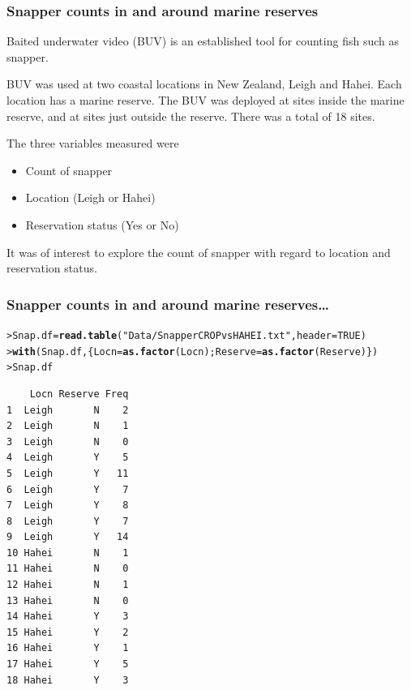 \documentclass{beamer}\usepackage[]{graphicx}\usepackage[]{xcolor}
\makeatletter
\newcommand{\hlnum}[1]{\textcolor[rgb]{0.686,0.059,0.569}{#1}}%
\newcommand{\hlstr}[1]{\textcolor[rgb]{0.192,0.494,0.8}{#1}}%
\newcommand{\hlstd}[1]{\textcolor[rgb]{0.345,0.345,0.345}{#1}}%
\newcommand{\hlkwb}[1]{\textcolor[rgb]{0.69,0.353,0.396}{#1}}%
\newcommand{\hlkwc}[1]{\textcolor[rgb]{0.333,0.667,0.333}{#1}}%
\newcommand{\hlkwd}[1]{\textcolor[rgb]{0.737,0.353,0.396}{\textbf{#1}}}%
\newenvironment{kframe}{%
 \def\at@end@of@kframe{}%
 \ifinner\ifhmode%
  \def\at@end@of@kframe{\end{minipage}}%
  \begin{minipage}{\columnwidth}%
 \fi\fi%
 \def\FrameCommand##1{\hskip\@totalleftmargin \hskip-\fboxsep
 \colorbox{shadecolor}{##1}\hskip-\fboxsep
     \hskip-\linewidth \hskip-\@totalleftmargin \hskip\columnwidth}%
 \MakeFramed {\advance\hsize-\width
   \@totalleftmargin\z@ \linewidth\hsize
   \@setminipage}}%
 {\par\unskip\endMakeFramed%
 \at@end@of@kframe}
\newenvironment{knitrout}{}{} %
\makeatother
\begin{document}



\begin{frame}[fragile]
\frametitle{Snapper counts in and around marine reserves}
Baited underwater video (BUV) is an established tool for counting fish such as snapper.
\medskip

BUV was used at two coastal locations in New Zealand, Leigh and Hahei. 
Each location has a marine reserve. 
The BUV was deployed at sites inside the marine reserve, 
and at sites just outside the reserve.
There was a total of 18 sites.
\medskip

The three variables measured were
\begin{itemize}
\item Count of snapper
\item Location (Leigh or Hahei)
\item Reservation status (Yes or No)
\end{itemize}
\medskip

It was of interest to explore the count of snapper with regard
to location and reservation status.
\end{frame}


\begin{frame}[fragile]
\frametitle{Snapper counts in and around marine reserves\ldots}

\begin{knitrout}\scriptsize
{}\color{fgcolor}\begin{kframe}
\begin{alltt}
\hlstd{> }\hlstd{Snap.df}\hlkwb{=}\hlkwd{read.table}\hlstd{(}\hlstr{"Data/SnapperCROPvsHAHEI.txt"}\hlstd{,}\hlkwc{header}\hlstd{=}\hlnum{TRUE}\hlstd{)}
\hlstd{> }\hlkwd{with}\hlstd{(Snap.df,\{Locn}\hlkwb{=}\hlkwd{as.factor}\hlstd{(Locn); Reserve}\hlkwb{=}\hlkwd{as.factor}\hlstd{(Reserve)\})}
\hlstd{> }\hlstd{Snap.df}
\end{alltt}
\begin{verbatim}
    Locn Reserve Freq
1  Leigh       N    2
2  Leigh       N    1
3  Leigh       N    0
4  Leigh       Y    5
5  Leigh       Y   11
6  Leigh       Y    7
7  Leigh       Y    8
8  Leigh       Y    7
9  Leigh       Y   14
10 Hahei       N    1
11 Hahei       N    0
12 Hahei       N    1
13 Hahei       N    0
14 Hahei       Y    3
15 Hahei       Y    2
16 Hahei       Y    1
17 Hahei       Y    5
18 Hahei       Y    3
\end{verbatim}
\end{kframe}
\end{knitrout}
\end{frame}
\end{document}
